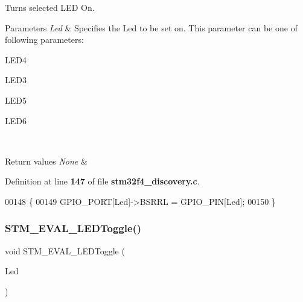 Turns selected L\+ED On. 


\begin{DoxyParams}{Parameters}
{\em Led} & Specifies the Led to be set on. This parameter can be one of following parameters\+: \begin{DoxyItemize}
\item L\+E\+D4 \item L\+E\+D3 \item L\+E\+D5 \item L\+E\+D6 \end{DoxyItemize}
\\
\hline
\end{DoxyParams}

\begin{DoxyRetVals}{Return values}
{\em None} & \\
\hline
\end{DoxyRetVals}


Definition at line \textbf{ 147} of file \textbf{ stm32f4\+\_\+discovery.\+c}.


\begin{DoxyCode}
00148 \{
00149   GPIO_PORT[Led]->BSRRL = GPIO_PIN[Led];
00150 \}
\end{DoxyCode}
\mbox{\label{group__STM32F4__DISCOVERY__LOW__LEVEL__Exported__Functions_ga5b1ccd57cf505c1d41440e62a845e4a9}} 
\subsubsection{S\+T\+M\+\_\+\+E\+V\+A\+L\+\_\+\+L\+E\+D\+Toggle()}
{\footnotesize\ttfamily void S\+T\+M\+\_\+\+E\+V\+A\+L\+\_\+\+L\+E\+D\+Toggle (\begin{DoxyParamCaption}\item[{\textbf{ Led\+\_\+\+Type\+Def}}]{Led }\end{DoxyParamCaption})}



